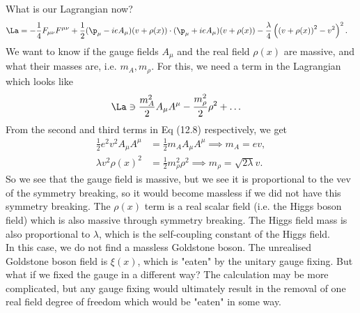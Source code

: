 \documentclass[relqm.tex]{subfiles}
\begin{document}
What is our Lagrangian now?
\begin{align}
    \La &= -\frac14F_{\mu\nu}F^{\mu\nu} + \frac12(\p_\mu-ieA_\mu)(v+\rho(x))\cdot(\p_\mu+ieA_\mu)(v+\rho(x)) - \frac{\lambda}{4}\left(\left(v+\rho(x)\right)^2-v^2\right)^2.
\end{align}
We want to know if the gauge fields $A_\mu$ and the real field $\rho(x)$ are massive, and what their masses are, i.e. $m_A,m_\rho$.
For this, we need a term in the Lagrangian which looks like
\begin{align}
    \La &\ni \frac{m_A^2}{2}A_\mu A^\mu - \frac{m_{\rho}^2}{2}\rho^2 + \dots
\end{align}
From the second and third terms in Eq (12.8) respectively, we get
\begin{align}
    \frac12 e^2v^2 A_\mu A^\mu &= \frac12 m_A A_\mu A^\mu \implies m_A = ev, \\
    \lambda v^2 \rho(x)^2 &= \frac12 m_{\rho}^2\rho^2 \implies m_{\rho} = \sqrt{2\lambda}v.
\end{align}
So we see that the gauge field is massive, but we see it is proportional to the vev of the symmetry breaking, so it would become massless if we did not have this symmetry breaking.
The $\rho(x)$ term is a real scalar field (i.e. the Higgs boson field) which is also massive through symmetry breaking.
The Higgs field mass is also proportional to $\lambda$, which is the self-coupling constant of the Higgs field. \\
In this case, we do not find a massless Goldstone boson.
The unrealised Goldstone boson field is $\xi(x)$, which is "eaten" by the unitary gauge fixing. 
But what if we fixed the gauge in a different way?
The calculation may be more complicated, but any gauge fixing would ultimately result in the removal of one real field degree of freedom which would be "eaten" in some way. 
\end{document}
